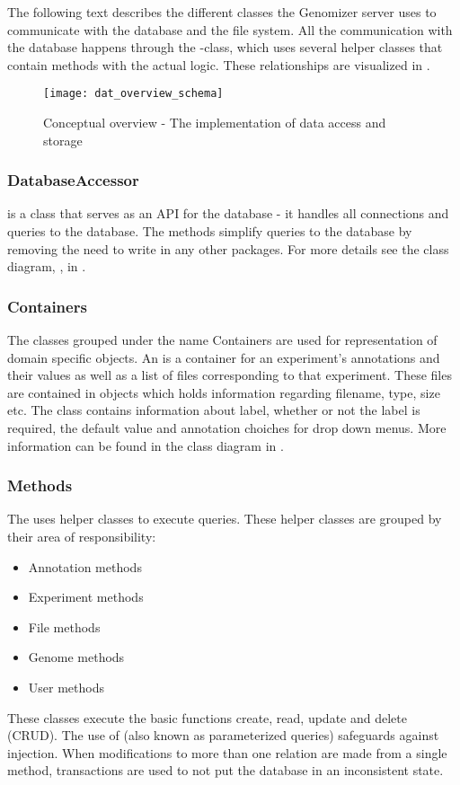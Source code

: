 The following text describes the different classes the Genomizer server uses to communicate with the database and the file system. All the communication with the database happens through the -class, which uses several helper classes that contain methods with the actual logic. These relationships are visualized in . 

\begin{figure}[h!]
	\centering
	\texttt{[image: dat\_overview\_schema]}
\caption{Conceptual overview - The implementation of data access and storage}
\label{fig:dat_overview_schema}
\end{figure}

\subsubsection{DatabaseAccessor}
 is a class that serves as an API for the  database - it handles all connections and queries to the database. The methods simplify queries to the database by removing the need to write  in any other packages. For more details see the class diagram, , in .

\subsubsection{Containers}
The classes grouped under the name Containers are used for representation of domain specific objects. An  is a container for an experiment's annotations and their values as well as a list of files corresponding to that experiment. These files are contained in  objects which holds information regarding filename, type, size etc. The  class contains information about label, whether or not the label is required, the default value and annotation choiches for drop down menus. More information can be found in the class diagram  in .

\subsubsection{Methods}
The  uses helper classes to execute  queries. These helper classes are grouped by their area of responsibility:
\begin{itemize}
\item Annotation methods
\item Experiment methods
\item File methods
\item Genome methods
\item User methods
\end{itemize}
These classes execute the basic  functions create, read, update and delete (CRUD). The use of  (also known as parameterized queries) safeguards against  injection. When modifications to more than one relation are made from a single method, transactions are used to not put the database in an inconsistent state.

